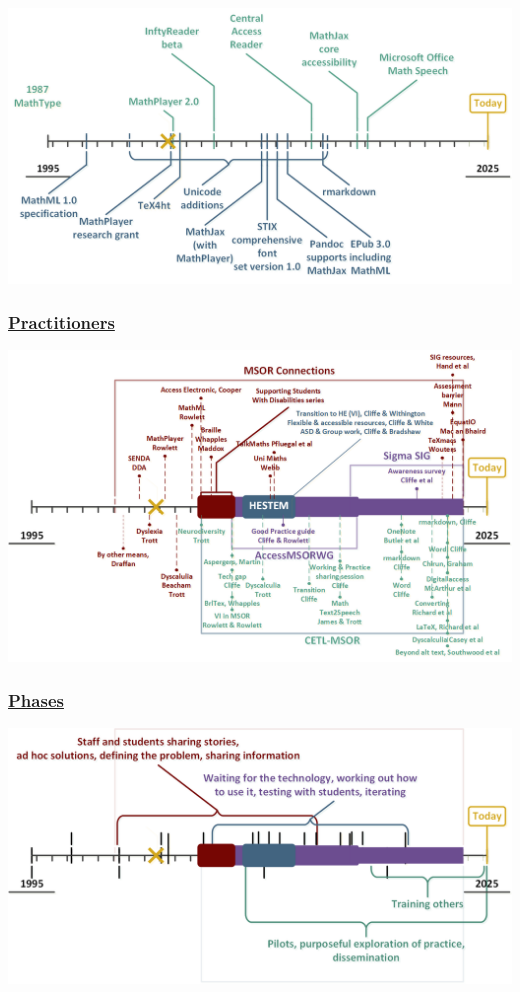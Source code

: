 \documentclass[
  letterpaper,
  DIV=11,
  numbers=noendperiod]{scrartcl}
\begin{document}
\includegraphics{./images/Technology-context.png}\\

\subsubsection{\texorpdfstring{\href{./images/alt/Our-work.xlsx}{Practitioners}}{Practitioners}}\label{practitioners}

\includegraphics{./images/Our-work.png}\\

\subsubsection{\texorpdfstring{\href{./images/alt/Our-work-phases.xlsx}{Phases}}{Phases}}\label{phases}

\includegraphics{./images/Our-work-phases.png}\\
\end{document}
